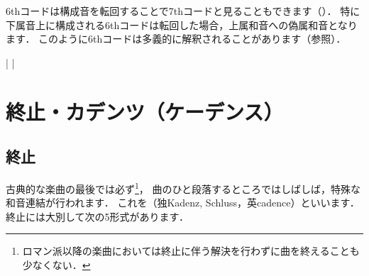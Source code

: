 \documentclass[dvipdfmx,uplatex,b5paper,openany,jbase=12Q,nomag*,textwidth-limit=44%
               ]{gachimuchi}[2020/05/05]
\begin{document}
6thコードは構成音を転回することで7thコードと見ることもできます（）．
特に下属音上に構成される6thコードは転回した場合，上属和音への偽属和音となります．
このように6thコードは多義的に解釈されることがあります（参照）．

\begin{floatMusic}[pos=ht,width=0.5\linewidth]
  \nostartrule%
  \Startpiece%
  \Notes%
  \en\bar%
  \Notes%
  \en%
  \setdoublebar\changecontext%
  \Notes%
  \en\bar%
  \Notes%
  \en\setdoublebar%
  \endpiece{}%
\end{floatMusic}



\chapter{終止・カデンツ（ケーデンス）}
\section{終止}
古典的な楽曲の最後では必ず\footnote{ロマン派以降の楽曲においては終止に伴う解決を行わずに曲を終えることも少なくない．}，
曲のひと段落するところではしばしば，特殊な和音連結が行われます．
これを（独Kadenz, Schluss，英cadence）といいます．
終止には大別して次の5形式があります．
\end{document}
